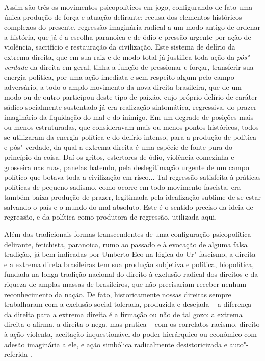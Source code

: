 Assim são três os movimentos psicopolíticos em jogo, configurando de
fato uma única produção de força e atuação delirante: recusa dos
elementos históricos complexos do presente, regressão imaginária radical
a um modo antigo de ordenar a história, que já é a escolha paranoica e
de ódio e pressão urgente por ação de violência, sacrifício e
restauração da civilização. Este sistema de delírio da extrema direita,
que em sua raiz e de modo total já justifica toda ação da
\emph{pós"-verdade} da direita em geral, tinha a função de pressionar e
forçar, transferir sua energia política, por uma ação imediata e sem
respeito algum pelo campo adversário, a todo o amplo movimento da nova
direita brasileira, que de um modo ou de outro participou deste tipo de
paixão, cujo próprio delírio de caráter sádico socialmente sustentado já
era realização sintomática, regressiva, do prazer imaginário da
liquidação do mal e do inimigo. Em um degrade de posições mais ou menos
estruturadas, que consideravam mais ou menos pontos históricos, todos se
utilizaram da energia política e do delírio intenso, para a produção de
política e pós"-verdade, da qual a extrema direita é uma espécie de fonte
pura do princípio da coisa. Daí os gritos, estertores de ódio, violência
comezinha e grosseira nas ruas, panelas batendo, pela deslegitimação
urgente de um campo político que botava toda a civilização em risco...
Tal regressão satisfeita à práticas políticas de pequeno sadismo, como
ocorre em todo movimento fascista, era também baixa produção de prazer,
legitimada pela idealização sublime de se estar salvando o país e o
mundo do mal absoluto. Este é o sentido preciso da ideia de regressão, e
da política como produtora de regressão, utilizada aqui.

Além das tradicionais formas transcendentes de uma configuração
psicopolítica delirante, fetichista, paranoica, rumo ao passado e à
evocação de alguma falsa tradição, já bem indicadas por Umberto Eco na
lógica do Ur"-fascismo, a direita e a extrema direta brasileiras tem sua
produção subjetiva e política, biopolítica, fundada na longa tradição
nacional do direito à exclusão radical dos direitos e da riqueza de
amplas massas de brasileiros, que não precisariam receber nenhum
reconhecimento da nação. De fato, historicamente nossas direitas sempre
trabalharam com a exclusão social tolerada, produzida e desejada -- a
diferença da direita para a extrema direita é a firmação ou não de tal
gozo: a extrema direita o afirma, a direita o nega, mas pratica -- com
os correlatos racismo, direito à ação violenta, aceitação inquestionável
do poder hierárquico ou econômico com adesão imaginária a ele, e ação
simbólica radicalmente desistoricizada e auto"-referida .

